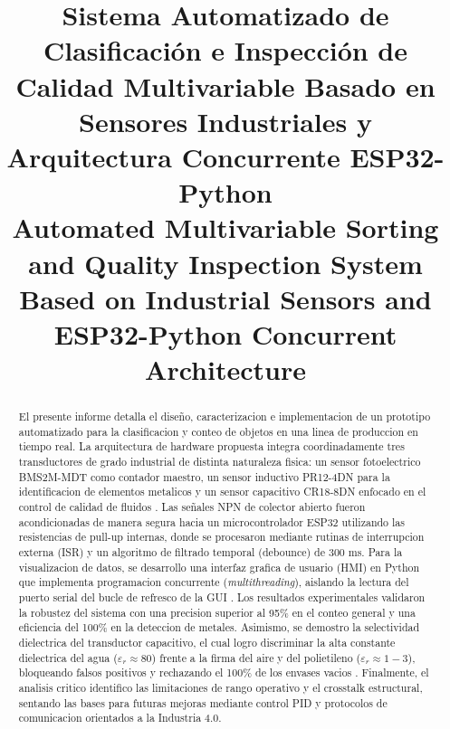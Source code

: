 \documentclass[conference]{IEEEtran}
\begin{document}
\title{Sistema Automatizado de Clasificación e Inspección de Calidad Multivariable Basado en Sensores Industriales y Arquitectura Concurrente ESP32-Python\\ {\huge Automated Multivariable Sorting and Quality Inspection System Based on Industrial Sensors and ESP32-Python Concurrent Architecture}}

\author{
}
\IEEEaftertitletext{\vspace{-1\baselineskip}}
\maketitle

\renewcommand\abstractname{Resumen}
\begin{abstract}
El presente informe detalla el diseño, caracterizacion e implementacion de un prototipo automatizado para la clasificacion y conteo de objetos en una linea de produccion en tiempo real. La arquitectura de hardware propuesta integra coordinadamente tres transductores de grado industrial de distinta naturaleza fisica: un sensor fotoelectrico  BMS2M-MDT como contador maestro, un sensor inductivo PR12-4DN para la identificacion de elementos metalicos y un sensor capacitivo CR18-8DN enfocado en el control de calidad de fluidos \cite{sensores_3, sensores_14}. Las señales NPN de colector abierto fueron acondicionadas de manera segura hacia un microcontrolador ESP32 utilizando las resistencias de pull-up internas, donde se procesaron mediante rutinas de interrupcion externa (ISR) y un algoritmo de filtrado temporal (debounce) de 300 ms. Para la visualizacion de datos, se desarrollo una interfaz grafica de usuario (HMI) en Python que implementa programacion concurrente (\textit{multithreading}), aislando la lectura del puerto serial del bucle de refresco de la GUI \cite{sensores_20}. Los resultados experimentales validaron la robustez del sistema con una precision superior al 95\% en el conteo general y una eficiencia del 100\% en la deteccion de metales. Asimismo, se demostro la selectividad dielectrica del transductor capacitivo, el cual logro discriminar la alta constante dielectrica del agua ($\varepsilon_r \approx 80$) frente a la firma del aire y del polietileno ($\varepsilon_r \approx 1-3$), bloqueando falsos positivos y rechazando el 100\% de los envases vacios \cite{sensores_16}. Finalmente, el analisis critico identifico las limitaciones de rango operativo y el crosstalk estructural, sentando las bases para futuras mejoras mediante control PID y protocolos de comunicacion orientados a la Industria 4.0.
\end{abstract}
\end{document}
